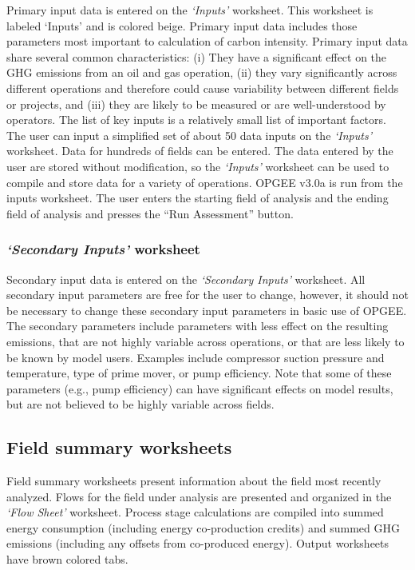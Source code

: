 \documentclass[11pt]{report}
\newcommand{\sheet}[1]{\textit{`{#1}'}}
\begin{document}
Primary input data is entered on the \sheet{Inputs} worksheet. This worksheet is labeled `Inputs' and is colored beige.
Primary input data includes those parameters most important to calculation of carbon intensity. Primary input data share several common characteristics: (i) They have a significant effect on the GHG emissions from an oil and gas operation, (ii) they vary significantly across different operations and therefore could cause variability between different fields or projects, and (iii) they are likely to be measured or are well-understood by operators. The list of key inputs is a relatively small list of important factors. 
The user can input a simplified set of about 50 data inputs on the \sheet{Inputs} worksheet. Data for hundreds of fields can be entered. The data entered by the user are stored without modification, so the \sheet{Inputs} worksheet can be used to compile and store data for a variety of operations.
OPGEE v3.0a is run from the inputs worksheet. The user enters the starting field of analysis and the ending field of analysis and presses the ``Run Assessment'' button.

\subsubsection{\sheet{Secondary Inputs} worksheet} 

Secondary input data is entered on the \sheet{Secondary Inputs} worksheet. All secondary input parameters are free for the user to change, however, it should not be necessary to change these secondary input parameters in basic use of OPGEE. The secondary parameters include parameters with less effect on the resulting emissions, that are not highly variable across operations, or that are less likely to be known by model users. Examples include compressor suction pressure and temperature, type of prime mover, or pump efficiency. Note that some of these parameters (e.g., pump efficiency) can have significant effects on model results, but are not believed to be highly variable across fields.

\subsection{Field summary worksheets} 

Field summary worksheets present information about the field most recently analyzed. Flows for the field under analysis are presented and organized in the \sheet{Flow Sheet} worksheet. Process stage calculations are compiled into summed energy consumption (including energy co-production credits) and summed GHG emissions (including any offsets from co-produced energy). Output worksheets have brown colored tabs.
\end{document}
